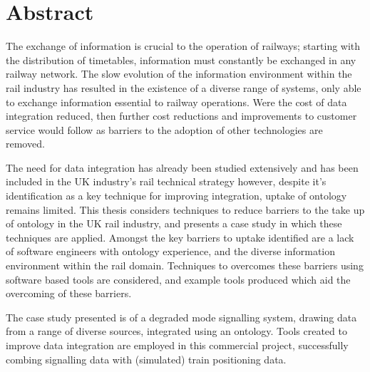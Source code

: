 \begingroup
\let\clearpage\relax
\let\cleardoublepage\relax
\let\cleardoublepage\relax

\chapter*{Abstract}
The exchange of information is crucial to the operation of railways; starting with the distribution of timetables, information must constantly be exchanged in any railway network. The slow evolution of the information environment within the rail industry has resulted in the existence of a diverse range of systems, only able to exchange information essential to railway operations. Were the cost of data integration reduced, then further cost reductions and improvements to customer service would follow as barriers to the adoption of other technologies are removed. 

The need for data integration has already been studied extensively and has been included in the UK industry's rail technical strategy however, despite it's identification as a key technique for improving integration, uptake of ontology remains limited. This thesis considers techniques to reduce barriers to the take up of ontology in the UK rail industry, and presents a case study in which these techniques are applied. Amongst the key barriers to uptake identified are a lack of software engineers with ontology experience, and the diverse information environment within the rail domain. Techniques to overcomes these barriers using software based tools are considered, and example tools produced which aid the overcoming of these barriers.

The case study presented is of a degraded mode signalling system, drawing data from a range of diverse sources, integrated using an ontology. Tools created to improve data integration are employed in this commercial project, successfully combing signalling data with (simulated) train positioning data.


\endgroup			

\vfill